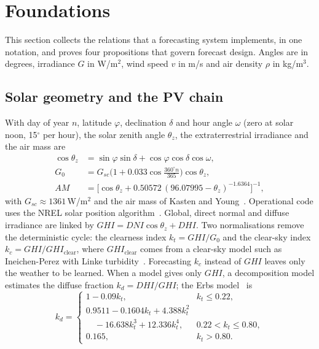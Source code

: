 \section{Foundations}
\label{sec:foundations}

This section collects the relations that a forecasting system implements, in one notation, and proves four propositions that govern forecast design. Angles are in degrees, irradiance $G$ in W/m$^2$, wind speed $v$ in m/s and air density $\rho$ in kg/m$^3$.

\subsection{Solar geometry and the PV chain}

With day of year $n$, latitude $\varphi$, declination $\delta$ and hour angle $\omega$ (zero at solar noon, 15$^\circ$ per hour), the solar zenith angle $\theta_z$, the extraterrestrial irradiance and the air mass are
\begin{align}
\cos\theta_z &= \sin\varphi\sin\delta+\cos\varphi\cos\delta\cos\omega, \label{eq:zenith}\\
G_0 &= G_{sc}\Big(1+0.033\cos\tfrac{360^\circ n}{365}\Big)\cos\theta_z, \\
AM &= \big[\cos\theta_z+0.50572\,(96.07995-\theta_z)^{-1.6364}\big]^{-1},
\end{align}
with $G_{sc}\approx1361$\,W/m$^2$ and the air mass of Kasten and Young~\cite{kasten1989airmass}. Operational code uses the NREL solar position algorithm~\cite{reda2004spa}. Global, direct normal and diffuse irradiance are linked by $GHI=DNI\cos\theta_z+DHI$. Two normalisations remove the deterministic cycle: the clearness index $k_t=GHI/G_0$ and the clear-sky index $k_c=GHI/GHI_{\text{clear}}$, where $GHI_{\text{clear}}$ comes from a clear-sky model such as Ineichen-Perez with Linke turbidity~\cite{ineichen2002linke}. Forecasting $k_c$ instead of $GHI$ leaves only the weather to be learned. When a model gives only $GHI$, a decomposition model estimates the diffuse fraction $k_d=DHI/GHI$; the Erbs model~\cite{erbs1982diffuse} is
\begin{equation}
k_d=\begin{cases}1-0.09k_t, & k_t\le0.22,\\ 0.9511-0.1604k_t+4.388k_t^2\\ \quad-16.638k_t^3+12.336k_t^4, & 0.22<k_t\le0.80,\\ 0.165, & k_t>0.80.\end{cases}
\end{equation}
